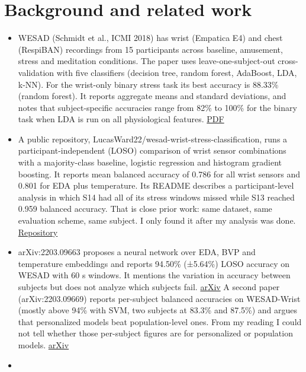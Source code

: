 \documentclass[11pt]{article}
\providecommand{\tightlist}{\setlength{\itemsep}{2pt}\setlength{\parskip}{0pt}}
\begin{document}
\hypertarget{background-and-related-work}{%
\section{Background and related
work}\label{background-and-related-work}}

\begin{itemize}
\tightlist
\item
  WESAD (Schmidt et al., ICMI 2018) has wrist (Empatica E4) and chest
  (RespiBAN) recordings from 15 participants across baseline, amusement,
  stress and meditation conditions. The paper uses leave-one-subject-out
  cross-validation with five classifiers (decision tree, random forest,
  AdaBoost, LDA, k-NN). For the wrist-only binary stress task its best
  accuracy is 88.33\% (random forest). It reports aggregate means and
  standard deviations, and notes that subject-specific accuracies range
  from 82\% to 100\% for the binary task when LDA is run on all
  physiological features.
  \href{https://ubi29.informatik.uni-siegen.de/usi/pdf/ubi_icmi2018.pdf}{PDF}
\item
  A public repository, LucasWard22/wesad-wrist-stress-classification,
  runs a participant-independent (LOSO) comparison of wrist sensor
  combinations with a majority-class baseline, logistic regression and
  histogram gradient boosting. It reports mean balanced accuracy of
  0.786 for all wrist sensors and 0.801 for EDA plus temperature. Its
  README describes a participant-level analysis in which S14 had all of
  its stress windows missed while S13 reached 0.959 balanced accuracy.
  That is close prior work: same dataset, same evaluation scheme, same
  subject. I only found it after my analysis was done.
  \href{https://github.com/LucasWard22/wesad-wrist-stress-classification}{Repository}
\item
  arXiv:2203.09663 proposes a neural network over EDA, BVP and
  temperature embeddings and reports 94.50\% (±5.64\%) LOSO accuracy on
  WESAD with 60 s windows. It mentions the variation in accuracy between
  subjects but does not analyze which subjects fail.
  \href{https://arxiv.org/pdf/2203.09663}{arXiv} A second paper
  (arXiv:2203.09669) reports per-subject balanced accuracies on
  WESAD-Wrist (mostly above 94\% with SVM, two subjects at 83.3\% and
  87.5\%) and argues that personalized models beat population-level
  ones. From my reading I could not tell whether those per-subject
  figures are for personalized or population models.
  \href{https://arxiv.org/pdf/2203.09669}{arXiv}
\item

\end{itemize}
\end{document}
